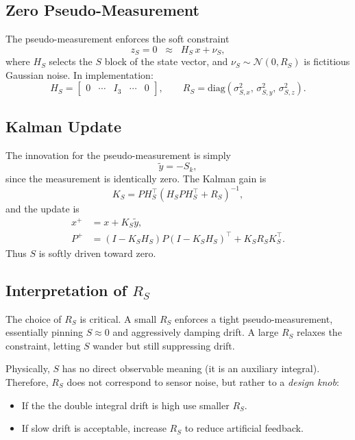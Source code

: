 \documentclass[10pt]{extarticle}
\begin{document}
\subsection{Zero Pseudo-Measurement}
The pseudo-measurement enforces the soft constraint
\begin{equation}
z_S = 0 \;\;\approx\;\; H_S\,x + \nu_S,
\label{eq:ps-meas}
\end{equation}
where $H_S$ selects the $S$ block of the state vector, and $\nu_S\sim\mathcal{N}(0,R_S)$
is fictitious Gaussian noise. In implementation:
\begin{equation}
H_S = \begin{bmatrix}0 & \cdots & I_3 & \cdots & 0\end{bmatrix},
\qquad
R_S = \mathrm{diag}(\sigma_{S,x}^2,\,\sigma_{S,y}^2,\,\sigma_{S,z}^2).
\label{eq:ps-HR}
\end{equation}

\subsection{Kalman Update}
The innovation for the pseudo-measurement is simply
\begin{equation}
\tilde y = -S_k,
\end{equation}
since the measurement is identically zero. The Kalman gain is
\begin{equation}
K_S = P H_S^\top (H_S P H_S^\top + R_S)^{-1},
\end{equation}
and the update is
\begin{align}
x^+ &= x + K_S\tilde y,\\
P^+ &= (I-K_SH_S)P(I-K_SH_S)^\top + K_SR_SK_S^\top.
\end{align}
Thus $S$ is softly driven toward zero.

\subsection{Interpretation of $R_S$}
The choice of $R_S$ is critical. A small $R_S$ enforces a tight pseudo-measurement,
essentially pinning $S\approx 0$ and aggressively damping drift. A large $R_S$ relaxes
the constraint, letting $S$ wander but still suppressing drift.

Physically, $S$ has no direct observable meaning (it is an auxiliary integral).
Therefore, $R_S$ does not correspond to sensor noise, but rather to a 
\emph{design knob}:
\begin{itemize}
\item If the the double integral drift is high use smaller $R_S$.
\item If slow drift is acceptable, increase $R_S$ to reduce artificial feedback.
\end{itemize}
\end{document}
